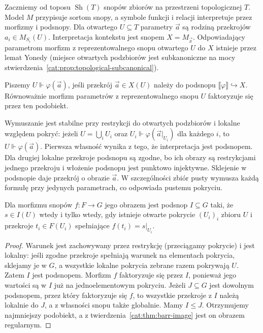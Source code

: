 Zaczniemy od toposu $\operatorname{Sh}(T)$ snopów zbiorów na przestrzeni topologicznej $T$. Model $M$ przypisuje sortom snopy, a symbole funkcji i relacji interpretuje przez morfizmy i podsnopy. Dla otwartego $U\subseteq T$ parametry $\vec a$ są rodziną przekrojów $a_i\in M_{S_i}(U)$. Interpretacja kontekstu jest snopem $X=M_{\vec x}$. Odpowiadający parametrom morfizm z reprezentowalnego snopu otwartego $U$ do $X$ istnieje przez lemat Yonedy (miejsce otwartych podzbiorów jest subkanoniczne na mocy stwierdzenia~\ref{cat:prop:topological-subcanonical}).

\begin{definicja}\label{cat:def:cl-forcing}
Piszemy $U\Vdash\varphi(\vec a)$, jeśli przekrój $\vec a\in X(U)$ należy do podsnopu $\llbracket\varphi\rrbracket\hookrightarrow X$. Równoważnie morfizm parametrów z reprezentowalnego snopu $U$ faktoryzuje się przez ten podobiekt.
\end{definicja}

Wymuszanie jest stabilne przy restrykcji do otwartych podzbiorów i lokalne względem pokryć: jeżeli $U=\bigcup_iU_i$ oraz $U_i\Vdash\varphi(\vec a|_{U_i})$ dla każdego $i$, to $U\Vdash\varphi(\vec a)$. Pierwsza własność wynika z tego, że interpretacja jest podsnopem. Dla drugiej lokalne przekroje podsnopu są zgodne, bo ich obrazy są restrykcjami jednego przekroju i włożenie podsnopu jest punktowo injektywne. Sklejenie w podsnopie daje przekrój o obrazie $\vec a$. W szczególności zbiór pusty wymusza każdą formułę przy jedynych parametrach, co odpowiada pustemu pokryciu.

\begin{lemat}\label{cat:lem:cl-sheaf-local-image}
Dla morfizmu snopów $f:F\to G$ jego obrazem jest podsnop $I\subseteq G$ taki, że $s\in I(U)$ wtedy i tylko wtedy, gdy istnieje otwarte pokrycie $(U_i)_i$ zbioru $U$ i przekroje $t_i\in F(U_i)$ spełniające $f(t_i)=s|_{U_i}$.
\end{lemat}
\begin{proof}
Warunek jest zachowywany przez restrykcję (przeciągamy pokrycie) i jest lokalny: jeśli zgodne przekroje spełniają warunek na elementach pokrycia, sklejamy je w $G$, a wszystkie lokalne pokrycia zebrane razem pokrywają $U$. Zatem $I$ jest podsnopem. Morfizm $f$ faktoryzuje się przez $I$, ponieważ jego wartości są w $I$ już na jednoelementowym pokryciu. Jeżeli $J\subseteq G$ jest dowolnym podsnopem, przez który faktoryzuje się $f$, to wszystkie przekroje z $I$ należą lokalnie do $J$, a z własności snopu także globalnie. Mamy $I\leq J$. Otrzymujemy najmniejszy podobiekt, a z twierdzenia~\ref{cat:thm:barr-image} jest on obrazem regularnym.
\end{proof}

